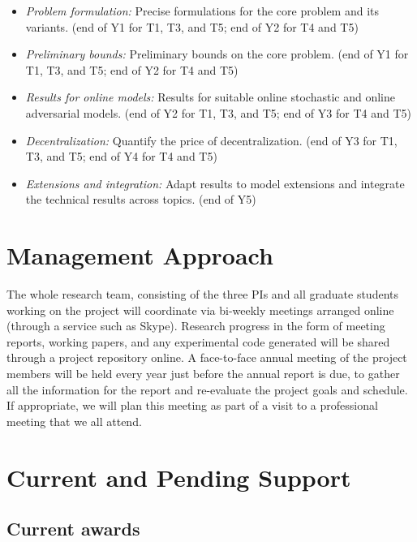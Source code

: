 \begin{itemize}
\item
{\sl Problem formulation:} Precise formulations for the core problem
and its variants.  (end of Y1 for T1, T3, and T5; end of Y2 for T4 and T5)
\item
{\sl Preliminary bounds:} Preliminary bounds on the core problem. (end
of Y1 for T1, T3, and T5; end of Y2 for T4 and T5)
\item
{\sl Results for online models:} Results for suitable online stochastic and
online adversarial models. (end of Y2 for T1, T3, and T5; end of Y3 for T4 and T5)
\item
{\sl Decentralization:} Quantify the price of decentralization.  (end
of Y3 for T1, T3, and T5; end of Y4 for T4 and T5)
\item
{\sl Extensions and integration:} Adapt results to model extensions
and integrate the technical results across topics. (end of Y5)
\end{itemize}
\newpage
\section{Management Approach}

The whole research team, consisting of the three PIs and all graduate
students working on the project will coordinate via bi-weekly meetings
arranged online (through a service such as Skype). Research progress
in the form of meeting reports, working papers, and any experimental
code generated will be shared through a project repository online. A
face-to-face annual meeting of the project members will be held every
year just before the annual report is due, to gather all the
information for the report and re-evaluate the project goals and
schedule.  If appropriate, we will plan this meeting as part of a
visit to a professional meeting that we all attend.

\section{Current and Pending Support}

\subsection{Current awards}

